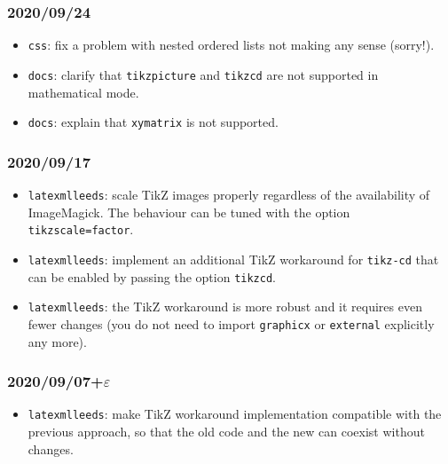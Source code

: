 \documentclass[a4paper]{article}
\theoremstyle{definition}
\begin{document}
\subsubsection*{2020/09/24}
\begin{itemize}
  \item \verb|css|: fix a problem with nested ordered lists not making any sense (sorry!).
  \item \verb|docs|: clarify that \verb|tikzpicture| and \verb|tikzcd| are not supported in mathematical mode.
  \item \verb|docs|: explain that \verb|xymatrix| is not supported.
\end{itemize}
\subsubsection*{2020/09/17}
\begin{itemize}
  \item \verb|latexmlleeds|: scale TikZ images properly regardless of the availability of ImageMagick. The behaviour can be tuned with the option \verb|tikzscale=factor|.
  \item \verb|latexmlleeds|: implement an additional TikZ workaround for \verb|tikz-cd| that can be enabled by passing the option \verb|tikzcd|.
  \item \verb|latexmlleeds|: the TikZ workaround is more robust and it requires even fewer changes (you do not need to import \verb|graphicx| or \verb|external| explicitly any more).
\end{itemize}
\subsubsection*{2020/09/07+\texorpdfstring{$\varepsilon$}{ɛ}}
\begin{itemize}
  \item \verb|latexmlleeds|: make TikZ workaround implementation compatible with the previous approach, so that the old code and the new can coexist without changes.
\end{itemize}
\end{document}
